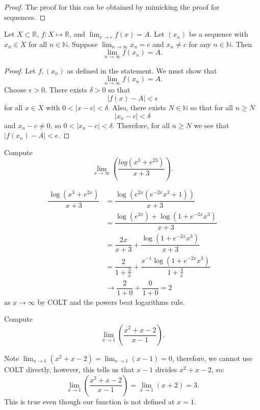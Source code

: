 \begin{proof}
    The proof for this can be obtained by mimicking the proof for sequences. %
\end{proof}

\begin{proposition}
    Let $X\subset\mathbb R$, $f:X\mapsto\mathbb R$, and $\lim_{x\to c}f(x)=A$. Let $(x_n)$ be a sequence with $x_n\in X$ for all $n\in\mathbb N$. Suppose $\lim_{n\to\infty}x_n=c$ and $x_n\neq c$ for any $n\in\mathbb N$. Then \[\lim_{n\to\infty}f(x_n)=A.\]
\end{proposition}

\begin{proof}
    Let $f,(x_n)$ as defined in the statement. We must show that \[\lim_{n\to\infty}f(x_n)=A.\] Choose $\epsilon>0$. There exists $\delta>0$ so that \[|f(x)-A|<\epsilon\] for all $x\in X$ with $0<|x-c|<\delta$. Also, there exists $N\in\mathbb N$ so that for all $n\geq N$ \[|x_n-c|<\delta\] and $x_n-c\neq 0$, so $0<|x_n-c|<\delta$. Therefore, for all $n\geq N$ we see that $|f(x_n)-A|<\epsilon$.
\end{proof}

\begin{example}
    Compute \[\lim_{x\to\infty}\left(\dfrac{log(x^3+e^{23})}{x+3}\right).\]
    
    \begin{align*}
        \dfrac{\log(x^3+e^{2x})}{x+3}&=\dfrac{\log(e^{2x}(e^{-2x}x^3+1))}{x+3}\\
        &=\dfrac{\log(e^{2x})+\log(1+e^{-2x}x^3)}{x+3}\\
        &=\dfrac{2x}{x+3}+\dfrac{\log(1+e^{-2x}x^3)}{x+3}\\
        &=\dfrac2{1+\frac3x}+\dfrac{x^{-1}\log(1+e^{-2x}x^3)}{1+\frac3x}\\
        &\to\dfrac2{1+0}+\dfrac0{1+0}=2
    \end{align*}
    as $x\to\infty$ by COLT and the powers beat logarithms rule.
\end{example}

\begin{example} 
    Compute \[\lim_{x\to1}\left(\dfrac{x^2+x-2}{x-1}\right).\]
    
    Note $\lim_{x\to1}(x^2+x-2)=\lim_{x\to1}(x-1)=0$, therefore, we cannot use COLT directly, however, this tells us that $x-1$ divides $x^2+x-2$, so: \[\lim_{x\to1}\left(\dfrac{x^2+x-2}{x-1}\right)=\lim_{x\to1}(x+2)=3.\] This is true even though our function is not defined at $x=1$.
\end{example}

